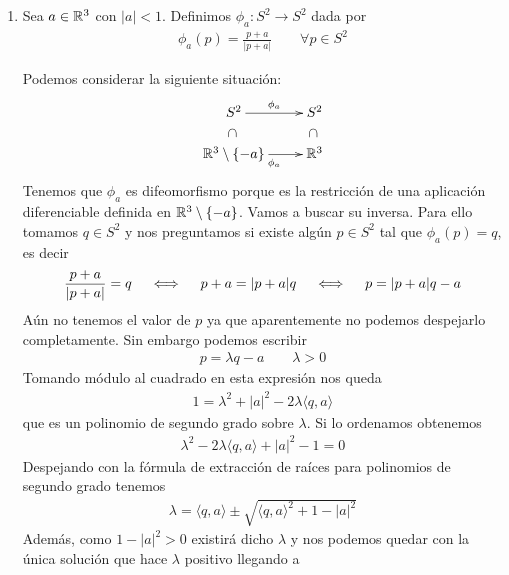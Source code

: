 \begin{ejemplo}
\begin{enumerate}
        \item Sea $a\in \mathbb{R}^3$ con $|a|<1$. Definimos $\phi_a : S^2 \to S^2$ dada por 
        \begin{gather*}
            \phi_a(p) =\frac{p+a}{|p+a|} \qquad \forall p \in S^2
        \end{gather*}
        \begin{solucion}
            Podemos considerar la siguiente situación:
            \begin{gather*}
                \xymatrix@R=5mm{
                    S^2 \ar[r]^{\phi_a} \ar@{}[d]|-*[@]{\subset} & S^2 \ar@{}[d]|-*[@]{\subset}\\
                    \bb{R}^3 \setminus \{-a\} \ar[r]_{\phi_a} & \bb{R}^3
                }
            \end{gather*}
            Tenemos que $\phi_a$ es difeomorfismo porque es la restricción de una aplicación diferenciable definida en $\mathbb{R}^3\setminus \{-a\}$. Vamos a buscar su inversa. Para ello tomamos $q\in S^2$ y nos preguntamos si existe algún $p\in S^2$ tal que $\phi_a(p)=q$, es decir
            \begin{gather*}
                \frac{p+a}{|p+a|}=q \quad \iff \quad 
                p+a = |p+a|q \quad \iff \quad
                p = |p+a|q-a
            \end{gather*}
            Aún no tenemos el valor de $p$ ya que aparentemente no podemos despejarlo completamente. Sin embargo podemos escribir
            \begin{gather*}
                p = \lambda q - a\qquad \lambda >0
            \end{gather*}
            Tomando módulo al cuadrado en esta expresión nos queda
            \begin{gather*}
                1 = \lambda^2 + |a|^2 -2\lambda \langle q,a \rangle
            \end{gather*}
            que es un polinomio de segundo grado sobre $\lambda$. Si lo ordenamos obtenemos
            \begin{gather*}
                \lambda^2 - 2\lambda \langle q,a\rangle + |a|^2 - 1 = 0
            \end{gather*}
            Despejando con la fórmula de extracción de raíces para polinomios de segundo grado tenemos
            \begin{gather*}
                \lambda = \langle q,a\rangle \pm \sqrt{\langle q,a\rangle^2 + 1 - |a|^2}
            \end{gather*}
            Además, como $1-|a|^2 > 0$ existirá dicho $\lambda$ y nos podemos quedar con la única solución que hace $\lambda$ positivo llegando a 

\end{solucion}
\end{enumerate}
\end{ejemplo}
